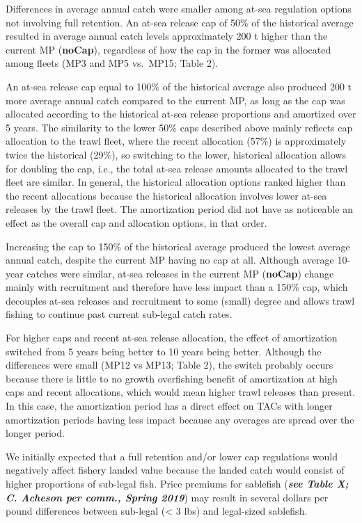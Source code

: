 \documentclass[11pt]{book}
\begin{document}
Differences in average annual catch were smaller among at-sea regulation options not involving full retention. An at-sea release cap of 50\% of the historical average resulted in average annual catch levels approximately 200 t higher than the current MP (\textbf{noCap}), regardless of how the cap in the former was allocated among fleets (MP3 and MP5 vs.~MP15; Table 2).

An at-sea release cap equal to 100\% of the historical average also produced 200 t more average annual catch compared to the current MP, as long as the cap was allocated according to the historical at-sea release proportions and amortized over 5 years. The similarity to the lower 50\% caps described above mainly reflects cap allocation to the trawl fleet, where the recent allocation (57\%) is approximately twice the historical (29\%), so switching to the lower, historical allocation allows for doubling the cap, i.e., the total at-sea release amounts allocated to the trawl fleet are similar. In general, the historical allocation options ranked higher than the recent allocations because the historical allocation involves lower at-sea releases by the trawl fleet. The amortization period did not have as noticeable an effect as the overall cap and allocation options, in that order.

Increasing the cap to 150\% of the historical average produced the lowest average annual catch, despite the current MP having no cap at all. Although average 10-year catches were similar, at-sea releases in the current MP (\textbf{noCap}) change mainly with recruitment and therefore have less impact than a 150\% cap, which decouples at-sea releases and recruitment to some (small) degree and allows trawl fishing to continue past current sub-legal catch rates.

For higher caps and recent at-sea release allocation, the effect of amortization switched from 5 years being better to 10 years being better. Although the differences were small (MP12 vs MP13; Table 2), the switch probably occurs because there is little to no growth overfishing benefit of amortization at high caps and recent allocations, which would mean higher trawl releases than present. In this case, the amortization period has a direct effect on TACs with longer amortization periods having less impact because any overages are spread over the longer period.

We initially expected that a full retention and/or lower cap regulations would negatively affect fishery landed value because the landed catch would consist of higher proportions of sub-legal fish. Price premiums for sablefish (\textbf{\emph{see Table X; C. Acheson per comm., Spring 2019}}) may result in several dollars per pound differences between sub-legal (\textless{} 3 lbs) and legal-sized sablefish.
\end{document}
